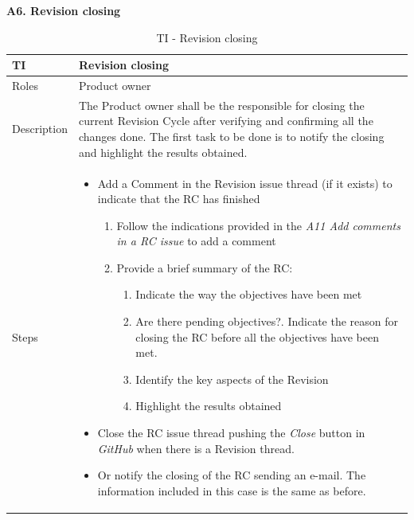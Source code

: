 \documentclass{template/openetcs_article}
\begin{document}
\textbf{A6. Revision closing}
\begin{table}[H]
\begin{tabular}{|m{2cm}|m{12cm}|}
\hline
\rowcolor{myblue}
TI & 
Revision closing
\\\hline
Roles &
Product owner
\\\hline
Description &
The Product owner shall be the responsible for closing the current Revision Cycle after verifying and confirming all the changes done. The first task to be done is to notify the closing and highlight the results obtained.
\\\hline
Steps &
\begin{itemize}
\item Add a Comment in the Revision issue thread (if it exists) to indicate that the RC has finished
\begin{enumerate}
\item Follow the indications provided in the {\it A11 Add comments in a RC issue} to add a comment
\item Provide a brief summary of the RC:
\begin{enumerate}
\item Indicate the way the objectives have been met 
\item Are there pending objectives?. Indicate the reason for closing the RC before all the objectives have been met.
\item Identify the key aspects of the Revision
\item Highlight the results obtained
\end{enumerate}
\end{enumerate}
\item Close the RC issue thread pushing the {\it Close} button in {\it GitHub} when there is a Revision thread.
\item Or notify the closing of the RC sending an e-mail. The information included in this case is the same as before.
\end{itemize}
\\\hline
\end{tabular}
\caption{TI - Revision closing}
\end{table}
\end{document}
